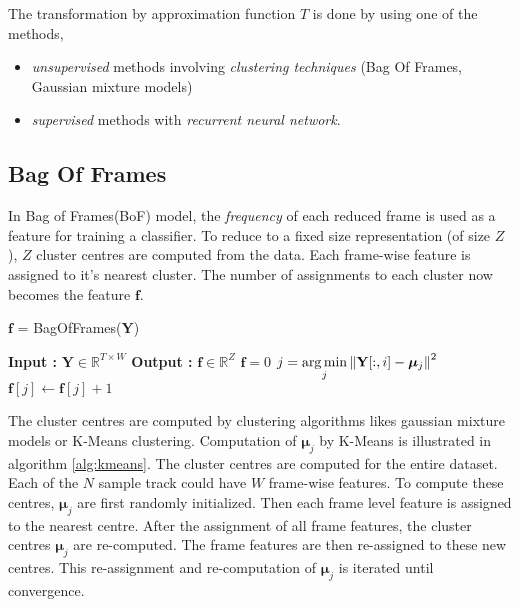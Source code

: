 \noindent The transformation by approximation function $T$ is done by using one of the methods,
\begin{itemize}
\setlength\itemsep{0em}
\item \textit{unsupervised} methods involving \textit{clustering techniques} (Bag Of Frames, Gaussian mixture models)
\item \textit{supervised} methods with \textit{recurrent neural network}. 
\end{itemize} 
 
\subsection{Bag Of Frames}
\label{clustering}
In Bag of Frames(BoF) model\cite{BoF}, the \textit{frequency} of each reduced frame is used as a feature for training a classifier. To reduce to a fixed size representation (of size $Z$), $Z$ cluster centres are computed from the data. Each frame-wise feature is assigned to it's nearest cluster. The number of assignments to each cluster now becomes the feature $\textbf{f}$. 
\begin{algorithm}
  \caption{$\textbf{f}$ = BagOfFrames($\textbf{Y}$) }\label{bof}
  \begin{algorithmic}[1]
    \Statex \textbf{Input :} $\textbf{Y} \in \mathbb{R}^{T \times W}$
    \Statex \textbf{Output :} $\textbf{f} \in \mathbb{R}^{Z}$
    \State $\textbf{f} = 0$
    \State $j = \operatorname*{arg\,min}\limits_{j} \left\lVert\textbf{Y}[:,i] - \bm{\mu}_{j}\right\rVert^{2}$ 
    \State $\textbf{f}[j] \leftarrow \textbf{f}[j] + 1$
    \EndFor
  \end{algorithmic}
\end{algorithm}
\FloatBarrier
\noindent The cluster centres are computed by clustering algorithms likes gaussian mixture models or K-Means clustering. Computation of $\bm{\mu}_{j}$ by K-Means is illustrated in algorithm \ref{alg:kmeans}. The cluster centres are computed for the entire dataset. Each of the $N$ sample track could have $W$ frame-wise features. To compute these centres, $\bm{\mu}_{j}$ are first randomly initialized. Then each frame level feature is assigned to the nearest centre. After the assignment of all frame features, the cluster centres $\bm{\mu}_{j}$ are re-computed. The frame features are then re-assigned to these new centres. This re-assignment and re-computation of $\bm{\mu}_{j}$ is iterated until convergence.  
